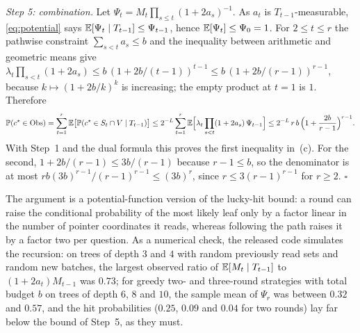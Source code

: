 \emph{Step 5: combination.}
Let $\Psi_t=M_t\prod_{s\le t}(1+2a_s)^{-1}$. As $a_t$ is $T_{t-1}$-measurable,
\eqref{eq:potential} says $\mathbb{E}[\Psi_t\mid T_{t-1}]\le\Psi_{t-1}$, hence
$\mathbb{E}[\Psi_t]\le\Psi_0=1$. For $2\le t\le r$ the pathwise constraint
$\sum_{s<t}a_s\le b$ and the inequality between arithmetic and geometric means
give $\lambda_t\prod_{s<t}(1+2a_s)\le b\,(1+2b/(t-1))^{t-1}\le b\,(1+2b/(r-1))^{r-1}$,
because $k\mapsto(1+2b/k)^k$ is increasing; the empty product at $t=1$ is
$1$. Therefore
\[
 \mathbb P(c^\star\in{\rm Obs})=\sum_{t=1}^r\mathbb{E}\big[\mathbb P(c^\star\in S_t\cap V\mid T_{t-1})\big]
 \le2^{-L}\sum_{t=1}^r\mathbb{E}\Big[\lambda_t\prod_{s<t}(1+2a_s)\,\Psi_{t-1}\Big]
 \le2^{-L}\,r\,b\,\Big(1+\frac{2b}{r-1}\Big)^{r-1}.
\]
With Step~1 and the dual formula this proves the first inequality in~(c). For
the second, $1+2b/(r-1)\le3b/(r-1)$ because $r-1\le b$, so the denominator is
at most $rb(3b)^{r-1}/(r-1)^{r-1}\le(3b)^r$, since $r\le3(r-1)^{r-1}$ for
$r\ge2$. \hfill$\square$

The argument is a potential-function version of the lucky-hit bound: a
round can raise the conditional probability of the most likely leaf only by
a factor linear in the number of pointer coordinates it reads, whereas
following the path raises it by a factor two per question. As a numerical check, the released code simulates the recursion: on trees of
depth $3$ and $4$ with random previously read sets and random new batches, the
largest observed ratio of $\mathbb{E}[M_t\mid T_{t-1}]$ to $(1+2a_t)M_{t-1}$ was
$0.73$; for greedy two- and three-round strategies with total budget $b$ on
trees of depth $6$, $8$ and $10$, the sample mean of $\Psi_r$ was between
$0.32$ and $0.57$, and the hit probabilities ($0.25$, $0.09$ and $0.04$ for two
rounds) lay far below the bound of Step~5, as they must.
